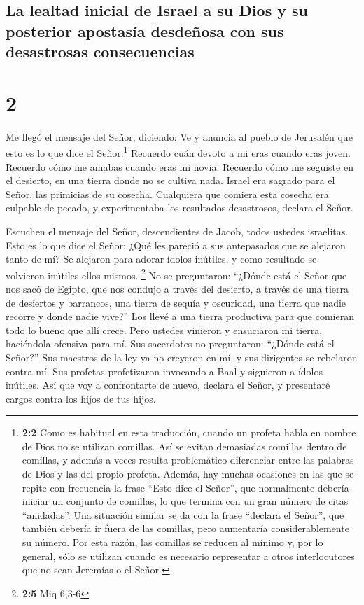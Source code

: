 \hypertarget{la-lealtad-inicial-de-israel-a-su-dios-y-su-posterior-apostasuxeda-desdeuxf1osa-con-sus-desastrosas-consecuencias}{%
\subsection{La lealtad inicial de Israel a su Dios y su posterior
apostasía desdeñosa con sus desastrosas
consecuencias}\label{la-lealtad-inicial-de-israel-a-su-dios-y-su-posterior-apostasuxeda-desdeuxf1osa-con-sus-desastrosas-consecuencias}}

\hypertarget{section-1}{%
\section{2}\label{section-1}}

 Me llegó el mensaje del Señor, diciendo: 
Ve y anuncia al pueblo de Jerusalén que esto es lo que dice el
Señor:\footnote{\textbf{2:2} Como es habitual en esta traducción, cuando
  un profeta habla en nombre de Dios no se utilizan comillas. Así se
  evitan demasiadas comillas dentro de comillas, y además a veces
  resulta problemático diferenciar entre las palabras de Dios y las del
  propio profeta. Además, hay muchas ocasiones en las que se repite con
  frecuencia la frase ``Esto dice el Señor'', que normalmente debería
  iniciar un conjunto de comillas, lo que termina con un gran número de
  citas ``anidadas''. Una situación similar se da con la frase ``declara
  el Señor'', que también debería ir fuera de las comillas, pero
  aumentaría considerablemente su número. Por esta razón, las comillas
  se reducen al mínimo y, por lo general, sólo se utilizan cuando es
  necesario representar a otros interlocutores que no sean Jeremías o el
  Señor.} Recuerdo cuán devoto a mi eras cuando eras joven. Recuerdo
cómo me amabas cuando eras mi novia. Recuerdo cómo me seguiste en el
desierto, en una tierra donde no se cultiva nada.  Israel
era sagrado para el Señor, las primicias de su cosecha. Cualquiera que
comiera esta cosecha era culpable de pecado, y experimentaba los
resultados desastrosos, declara el Señor.

 Escuchen el mensaje del Señor, descendientes de Jacob,
todos ustedes israelitas.  Esto es lo que dice el Señor:
¿Qué les pareció a sus antepasados que se alejaron tanto de mí? Se
alejaron para adorar ídolos inútiles, y como resultado se volvieron
inútiles ellos mismos. \footnote{\textbf{2:5} Miq 6,3-6} 
No se preguntaron: ``¿Dónde está el Señor que nos sacó de Egipto, que
nos condujo a través del desierto, a través de una tierra de desiertos y
barrancos, una tierra de sequía y oscuridad, una tierra que nadie
recorre y donde nadie vive?''  Los llevé a una tierra
productiva para que comieran todo lo bueno que allí crece. Pero ustedes
vinieron y ensuciaron mi tierra, haciéndola ofensiva para mí.
 Sus sacerdotes no preguntaron: ``¿Dónde está el Señor?''
Sus maestros de la ley ya no creyeron en mí, y sus dirigentes se
rebelaron contra mí. Sus profetas profetizaron invocando a Baal y
siguieron a ídolos inútiles.  Así que voy a confrontarte
de nuevo, declara el Señor, y presentaré cargos contra los hijos de tus
hijos.

